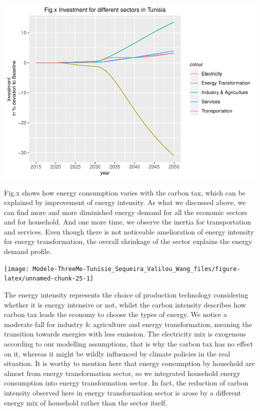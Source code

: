 \documentclass[
]{article}
\begin{document}
\begin{center}\includegraphics[width=0.7\linewidth,height=0.7\textheight]{Modele-ThreeMe-Tunisie_Sequeira_Valilou_Wang_files/figure-latex/unnamed-chunk-24-1} \end{center}

Fig.x shows how energy consumption varies with the carbon tax, which can
be explained by improvement of energy intensity. As what we discussed
above, we can find more and more diminished energy demand for all the
economic sectors and for household. And one more time, we observe the
inertia for transportation and services. Even though there is not
noticeable amelioration of energy intensity for energy transformation,
the overall shrinkage of the sector explains the energy demand profile.

\begin{center}\texttt{[image: Modele-ThreeMe-Tunisie\_Sequeira\_Valilou\_Wang\_files/figure-latex/unnamed-chunk-25-1]} \end{center}

The energy intensity represents the choice of production technology
considering whether it is energy intensive or not, whilst the carbon
intensity describes how carbon tax leads the economy to choose the types
of energy. We notice a moderate fall for industry \& agriculture and
energy transformation, meaning the transition towards energies with less
emission. The electricity mix is exogenous according to our modelling
assumptions, that is why the carbon tax has no effect on it, whereas it
might be wildly influenced by climate policies in the real situation. It
is worthy to mention here that energy consumption by household are
almost from energy transformation sector, so we integrated household
energy consumption into energy transformation sector. In fact, the
reduction of carbon intensity observed here in energy transformation
sector is arose by a different energy mix of household rather than the
sector itself.
\end{document}
